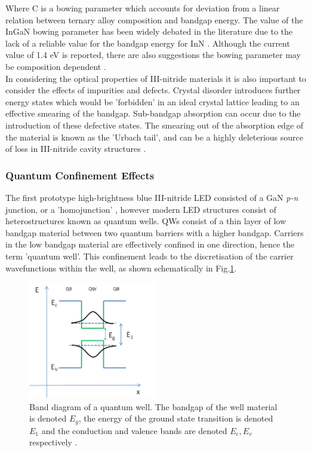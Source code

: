 Where C is a bowing parameter which accounts for deviation from a linear relation between ternary alloy composition and bandgap energy. The value of the InGaN bowing parameter has been widely debated in the literature due to the lack of a reliable value for the bandgap energy for InN \cite{Vurgaftman2003}. Although the current value of 1.4 eV is reported, there are also suggestions the bowing parameter may be composition dependent \cite{Wu2002,McCluskey2003,Moses2010}.\\
In considering the optical properties of III-nitride materials it is also important to consider the effects of impurities and defects. Crystal disorder introduces further energy states which would be 'forbidden' in an ideal crystal lattice leading to an effective smearing of the bandgap. Sub-bandgap absorption can occur due to the introduction of these defective states. The smearing out of the absorption edge of the material is known as the 'Urbach tail', and can be a highly deleterious source of loss in III-nitride cavity structures \cite{Puchtler2015}. 

\subsubsection{Quantum Confinement Effects}

The first prototype high-brightness blue III-nitride LED consisted of a GaN {\it p-n} junction, or a 'homojunction' \cite{Nakamura1991}, however modern LED structures consist of heterostructures known as quantum wells. QWs consist of a thin layer of low bandgap material between two quantum barriers with a higher bandgap. Carriers in the low bandgap material are effectively confined in one direction, hence the term 'quantum well'. This confinement leads to the discretisation of the carrier wavefunctions within the well, as shown schematically in Fig.\ref{QW}.

\begin{figure}[h]
	\centering
	\includegraphics[width=0.5\textwidth, trim = 4 4 4 4 , clip]{Figs/Ch1/BandstructureQW.png}
	\caption {Band diagram of a quantum well. The bandgap of the well material is denoted $E_{g}$, the energy of the ground state transition is denoted $E_{1}$ and the conduction and valence bands are denoted $E_{c},E_{v}$ respectively \cite{Ren2015}.}
	\label{QW}
\end{figure}
\FloatBarrier

